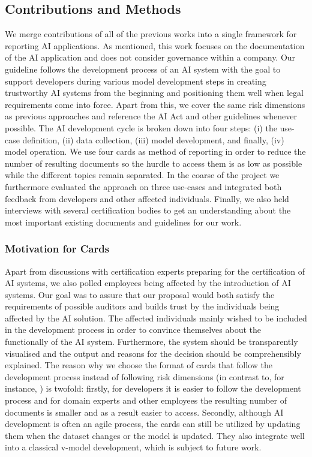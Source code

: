 \subsection{Contributions and Methods}
We merge contributions of all of the previous works into a single framework for reporting AI applications. As mentioned, this work focuses on the documentation of the AI application and does not consider governance  within a company. 
Our guideline follows the development process of an AI system with the goal to support developers during various model development steps in creating trustworthy AI systems from the beginning and positioning them well when legal requirements come into force. Apart from this, we cover the same risk dimensions as previous approaches and reference the AI Act and other guidelines whenever possible. The AI development cycle is broken down into four steps: (i) the use-case definition, (ii) data collection, (iii) model development, and finally,  (iv) model operation. We use four cards as method of reporting in order to reduce the number of resulting documents so  the hurdle to access them is as low as possible while the different topics remain separated. In the coarse of the project we furthermore evaluated the approach on three use-cases and integrated both feedback from developers and other affected individuals. Finally, we also held interviews with several certification bodies to get an understanding about the most important existing documents and guidelines for our work.

\subsubsection{Motivation for Cards}
Apart from discussions with certification experts preparing for the certification of AI systems, we also polled employees being affected by the introduction 
of AI systems. Our goal was to assure that our proposal would both satisfy the requirements of possible auditors and builds trust by the individuals being affected by the AI solution. 
The affected individuals mainly wished to be included in the development process in order to convince themselves about the functionally of the AI system. Furthermore, the system should be transparently visualised and the output and reasons for the decision should be comprehensibly explained. %
The reason why we choose the format of cards that follow the development process instead of following risk dimensions (in contrast to, for instance, \cite{poretschkin2021_IAIS_Leitfaden}) is twofold: firstly, for developers it is easier to follow the development process and for domain experts and other employees the resulting number of documents is smaller and as a result easier to access.
Secondly, although AI development is often an agile process, the cards can still be utilized by updating them when the dataset changes or the model is updated. They also integrate well into a classical v-model development, which is subject to future work. 

